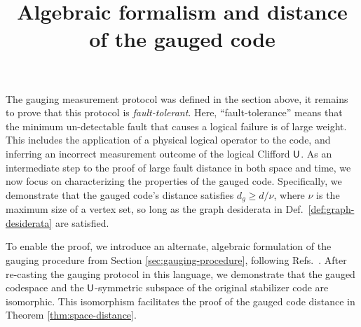 \documentclass[11pt]{article}
\author{}
\title{Algebraic formalism and distance of the gauged code}
\begin{document}
    
    
    \maketitle

\fi

The gauging measurement protocol was defined in the section above, it remains to prove that this protocol is \emph{fault-tolerant}. Here, ``fault-tolerance'' means that the minimum un-detectable fault that causes a logical failure is of large weight. This includes the application of a physical logical operator to the code, and inferring an incorrect measurement outcome of the logical Clifford $\mathsf{U}$. As an intermediate step to the proof of large fault distance in both space and time, we now focus on characterizing the properties of the gauged code. Specifically, we demonstrate that the gauged code's distance satisfies $d_g\geq d/\nu$, where $\nu$ is the maximum size of a vertex set, so long as the graph desiderata in Def.~\ref{def:graph-desiderata} are satisfied. 

To enable the proof, we introduce an alternate, algebraic formulation of the gauging procedure from Section \ref{sec:gauging-procedure}, following Refs.~\cite{Bulmash_2019,Prem_2019}. After re-casting the gauging protocol in this language, we demonstrate that the gauged codespace and the $\mathsf{U}$-symmetric subspace of the original stabilizer code are isomorphic. This isomorphism facilitates the proof of the gauged code distance in Theorem \ref{thm:space-distance}.
 
\end{document}
